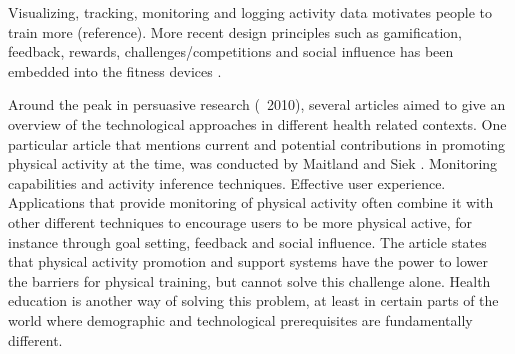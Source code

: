 Visualizing, tracking, monitoring and logging activity data motivates people to train more (reference). More recent design principles such as gamification, feedback, rewards, challenges/competitions and social influence has been embedded into the fitness devices
\cite{meske_potential_2019}.
 
Around the peak in persuasive research (~2010), several articles aimed to give an overview of the technological approaches in different health related contexts. One particular article that mentions current and potential contributions in promoting physical activity at the time, was conducted by Maitland and Siek \cite{maitland_technological_2009}.
Monitoring capabilities and activity inference techniques. Effective user experience. Applications that provide monitoring of physical activity often combine it with other different techniques to encourage users to be more physical active, for instance through goal setting, feedback and social influence. The article states that physical activity promotion and support systems have the power to lower the barriers for physical training, but cannot solve this challenge alone. Health education is another way of solving this problem, at least in certain parts of the world where demographic and technological prerequisites are fundamentally different.

